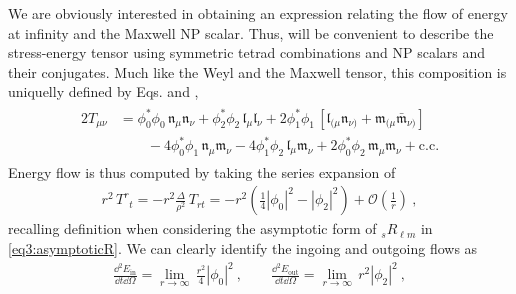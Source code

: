 We are obviously interested in obtaining an expression relating the flow of energy at infinity and the Maxwell NP scalar. Thus, will be convenient to describe the stress-energy tensor using symmetric tetrad combinations and NP scalars and their conjugates. Much like the Weyl and the Maxwell tensor, this composition is uniquelly defined by Eqs.  and ,
\begin{align}
    \begin{split}
    2 T_{\mu\nu} &= \phi_0^* \phi_0 \, \mathfrak{n}_\mu \mathfrak{n}_\nu + \phi_2^* \phi_2 \, \mathfrak{l}_\mu \mathfrak{l}_\nu + 2 \phi_1^* \phi_1 \, [ \mathfrak{l}_{(\mu} \mathfrak{n}_{\nu)} + \mathfrak{m}_{(\mu} \bar{\mathfrak{m}}_{\nu)} ] \\
    &\qquad - 4 \phi_0^* \phi_1 \, \mathfrak{n}_\mu \mathfrak{m}_\nu - 4 \phi_1^* \phi_2 \, \mathfrak{l}_\mu \mathfrak{m}_\nu + 2 \phi_0^* \phi_2 \, \mathfrak{m}_\mu \mathfrak{m}_\nu + \text{c.c.}
    \end{split}
    \label{eq3:stressEnergyPhi}
\end{align}
Energy flow is thus computed by taking the series expansion of
\begin{align}
    r^2 \,T^{r}{}_t = - r^2 \frac{\Delta}{\rho^2} \,T_{rt} = - r^2 \left(\frac{1}{4} |\phi_0|^2 - |\phi_2|^2\right) + \mathscr{O}\left(\frac{1}{r}\right) ~,
\end{align}
recalling definition  when considering the asymptotic form of ${}_{s}R_{\ell m}$ in \eqref{eq3:asymptoticR}.
We can clearly identify the ingoing and outgoing flows as
\begin{align}
    \frac{\dd^2 E_\mathrm{in}}{\dd t \dd\Omega} = \lim_{r\to\infty} \,\frac{r^2}{4} |\phi_0|^2 ~,\qquad \frac{\dd^2 E_\mathrm{out}}{\dd t \dd\Omega} = \lim_{r\to\infty} \, r^2 |\phi_2|^2 ~,
\end{align}

